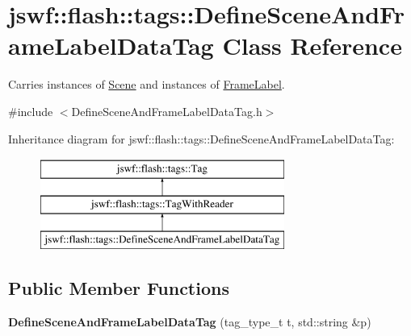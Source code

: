 \hypertarget{classjswf_1_1flash_1_1tags_1_1_define_scene_and_frame_label_data_tag}{\section{jswf\+:\+:flash\+:\+:tags\+:\+:Define\+Scene\+And\+Frame\+Label\+Data\+Tag Class Reference}
\label{classjswf_1_1flash_1_1tags_1_1_define_scene_and_frame_label_data_tag}
}


Carries instances of \hyperlink{structjswf_1_1flash_1_1_scene}{Scene} and instances of \hyperlink{structjswf_1_1flash_1_1_frame_label}{Frame\+Label}.  




{\ttfamily \#include $<$Define\+Scene\+And\+Frame\+Label\+Data\+Tag.\+h$>$}

Inheritance diagram for jswf\+:\+:flash\+:\+:tags\+:\+:Define\+Scene\+And\+Frame\+Label\+Data\+Tag\+:\begin{figure}[H]
\begin{center}
\leavevmode
\includegraphics[height=3.000000cm]{classjswf_1_1flash_1_1tags_1_1_define_scene_and_frame_label_data_tag}
\end{center}
\end{figure}
\subsection*{Public Member Functions}
\begin{DoxyCompactItemize}
\item 
\hypertarget{classjswf_1_1flash_1_1tags_1_1_define_scene_and_frame_label_data_tag_a047c7ef3c94ed3149952d2e0a8b84c44}{{\bfseries Define\+Scene\+And\+Frame\+Label\+Data\+Tag} (tag\+\_\+type\+\_\+t t, std\+::string \&p)}\label{classjswf_1_1flash_1_1tags_1_1_define_scene_and_frame_label_data_tag_a047c7ef3c94ed3149952d2e0a8b84c44}

\end{DoxyCompactItemize}
